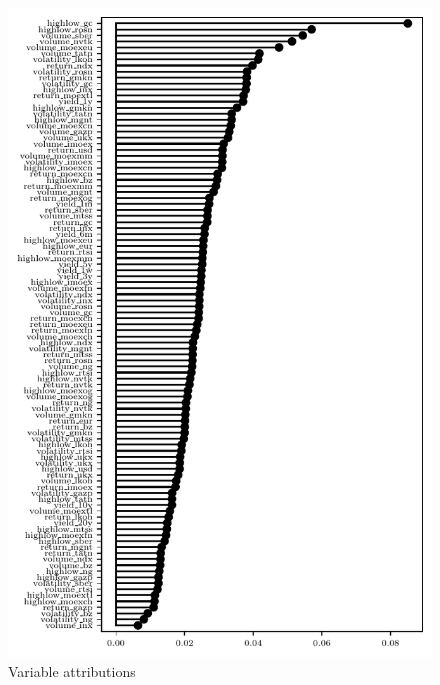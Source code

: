 \documentclass[review, authoryear]{elsarticle}
\begin{document}
\begin{figure}[h]
	\centering
	\includegraphics{all_vars_shap.pdf}
	\caption{Variable attributions}
	\label{fig:all_vars_shap}
\end{figure}
\end{document}
